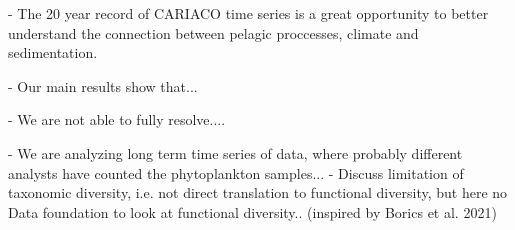 \documentclass[draft]{agujournal2019}
\begin{document}
- The 20 year record of CARIACO time series is a great opportunity to better understand the connection between pelagic proccesses, climate and sedimentation. 

- Our main results show that...

- We are not able to fully resolve....


- We are analyzing long term time series of data, where probably different analysts have counted the phytoplankton samples...
- Discuss limitation of taxonomic diversity, i.e. not direct translation to functional diversity, but here no Data foundation to look at functional diversity.. (inspired by Borics et al. 2021)
\end{document}

